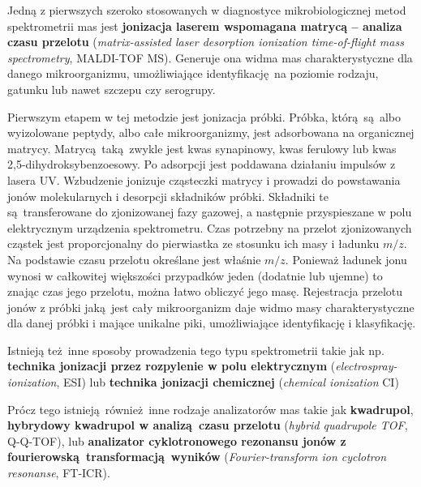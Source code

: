 \documentclass[two column, twoside, a4paper]{article}
\begin{document}
Jedną z pierwszych szeroko stosowanych w diagnostyce mikrobiologicznej metod spektrometrii mas jest \textbf{jonizacja laserem wspomagana matrycą -- analiza czasu przelotu} (\textit{matrix-assisted laser desorption ionization time-of-flight mass spectrometry}, MALDI-TOF MS). Generuje ona widma mas charakterystyczne dla danego mikroorganizmu, umożliwiające identyfikację na poziomie rodzaju, gatunku lub nawet szczepu czy serogrupy\autocite{Biswas2013, Brown2019, Croxatto2012}.

Pierwszym etapem w tej metodzie jest jonizacja próbki. Próbka, którą są albo wyizolowane peptydy, albo całe mikroorganizmy, jest adsorbowana na organicznej matrycy. Matrycą taką zwykle jest kwas synapinowy, kwas ferulowy lub kwas 2,5-dihydroksybenzoesowy. Po adsorpcji jest poddawana działaniu impulsów z lasera UV. Wzbudzenie jonizuje cząsteczki matrycy i prowadzi do powstawania jonów molekularnych i desorpcji składników próbki. Składniki te są transferowane do zjonizowanej fazy gazowej, a następnie przyspieszane w polu elektrycznym urządzenia spektrometru. Czas potrzebny na przelot zjonizowanych cząstek jest proporcjonalny do pierwiastka ze stosunku ich masy i ładunku $m/z$. Na podstawie czasu przelotu określane jest właśnie $m/z$. Ponieważ ładunek jonu wynosi w całkowitej większości przypadków jeden (dodatnie lub ujemne) to znając czas jego przelotu, można łatwo obliczyć jego masę. Rejestracja przelotu jonów z próbki jaką jest cały mikroorganizm daje widmo masy charakterystyczne dla danej próbki i mające unikalne piki, umożliwiające identyfikację i klasyfikację\autocite{Brown2019, Croxatto2012}.


Istnieją też inne sposoby prowadzenia tego typu spektrometrii takie jak np. \textbf{technika jonizacji przez rozpylenie w polu elektrycznym} (\textit{electrospray-ionization}, ESI) lub \textbf{technika jonizacji chemicznej} (\textit{chemical ionization} CI)\autocite{Brown2019, Croxatto2012}

Prócz tego istnieją również inne rodzaje analizatorów mas takie jak \textbf{kwadrupol}, \textbf{hybrydowy kwadrupol w analizą czasu przelotu} (\textit{hybrid quadrupole TOF}, Q-Q-TOF), lub \textbf{analizator cyklotronowego rezonansu jonów z fourierowską transformacją wyników} (\textit{Fourier-transform ion cyclotron resonanse}, FT-ICR)\autocite{Brown2019}.
\end{document}
